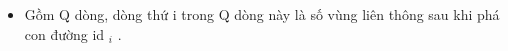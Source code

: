 \begin{itemize}
	\item     Gồm Q dòng, dòng thứ i trong Q dòng này là số vùng liên thông sau khi phá con đường id    $_     i    $    .   
\end{itemize}

\